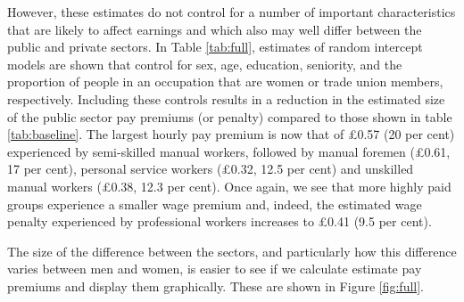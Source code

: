 \documentclass[a4paper,11pt,titlepage]{article}
\begin{document}
However, these estimates do not control for a number of important characteristics
that are likely to affect earnings and which also may well differ between the public and
private sectors. In Table \ref{tab:full}, estimates of random intercept models are shown that control
for sex, age, education, seniority, and the proportion of people in an occupation that are
women or trade union members, respectively. Including these controls results in a reduction in the estimated size of the public sector pay premiums (or penalty) compared to those shown in table \ref{tab:baseline}.  The largest hourly pay premium is now that of \pounds 0.57 (20
per cent) experienced by semi-skilled manual workers, followed by manual foremen
(\pounds 0.61, 17 per cent), personal service workers (\pounds 0.32, 12.5 per cent) and unskilled manual
workers (\pounds 0.38, 12.3 per cent). Once again, we see that more highly paid groups experience a smaller wage premium and, indeed, the estimated wage penalty experienced by professional workers increases to \pounds 0.41 (9.5 per cent).

The size of the difference between the sectors, and particularly how this difference
varies between men and women, is easier to see if we calculate estimate pay premiums and display them graphically. These are shown in Figure \ref{fig:full}.
\end{document}
